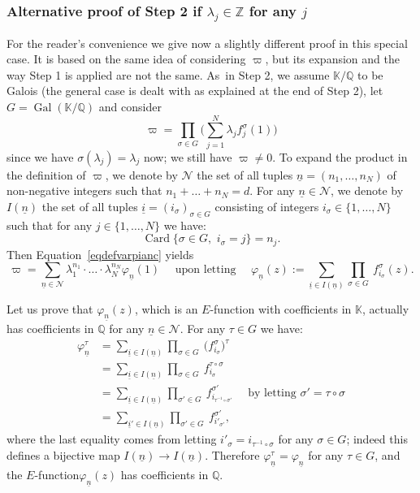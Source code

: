 \documentclass[11pt]{article}
\numberwithin{equation}{section}
\newcommand{\Efunction}{$E$\nobreakdash-func\-tion\xspace}
\theoremstyle{definition}
\newcommand{\Z}{\mathbb{Z}}
\newcommand{\Q}{\mathbb{Q}}
\newcommand{\K}{\mathbb{K}}
\DeclareMathOperator{\Gal}{Gal}
\newcommand{\calN}{\mathcal N}
\DeclareMathOperator{\Card}{Card}
\newcommand{\isoul}{{\underline{i}}}
\newcommand{\nsoul}{\underline{n}}
\begin{document}
\subsubsection*{Alternative proof of Step 2 if $\lambda_j\in\Z$ for any $j$}
For the reader's convenience we give now a slightly different proof in this special case. It is based on the same idea of considering $\varpi$, but its expansion and the way Step 1 is applied are not the same. As~in Step 2, we assume $\K/\Q$ to be Galois (the general case is dealt with as explained at the end of Step 2), let $G=\Gal(\K/\Q)$ and consider
\begin{equation} \label{eqdefvarpianc}
\varpi = \prod_{\sigma\in G} \Big( \sum_{j=1}^N \lambda_j f_j^\sigma(1)\Big)
\end{equation}
since we have $\sigma(\lambda_j)=\lambda_j$ now; we still have $\varpi\neq 0$. To expand the product in the definition of $\varpi$, we denote by $\calN$ the set of all tuples $\nsoul = (n_1,\ldots,n_N)$ of non-negative integers such that $ n_1 + \ldots + n_N = d$. For any $\nsoul\in\calN$, we denote by $I(\nsoul) $ the set of all tuples $\isoul = (i_\sigma)_{\sigma\in G}$ consisting of	 integers $i_\sigma\in\{1,\ldots,N\}$ such that for any $j\in\{1,\ldots,N\}$ we have:
\[
\Card \{ \sigma\in G, \, \, i_\sigma=j\}=n_j.
\]
Then Equation~\eqref{eqdefvarpianc} yields
\begin{equation} \label{eqvarpi2}
\varpi = \sum_{\nsoul \in \calN} \lambda_1^{n_1} \cdot \ldots \cdot \lambda_N^{n_N} \varphi_{\nsoul}(1) \quad \mbox{ upon letting }\quad
\varphi_{\nsoul}(z) := \sum_{ \isoul\in I(\nsoul)} \prod_{\sigma\in G} \ f_{i_\sigma}^\sigma(z) .
\end{equation}

Let us prove that $\varphi_{\nsoul}(z)$, which is an \Efunction with coefficients in $\K$, actually has coefficients in $\Q$ for any $\nsoul\in\calN$. For any $\tau\in G$ we have:
\begin{align*}
\varphi_{\nsoul} ^\tau
&= \sum_{ \isoul\in I(\nsoul)} \prod_{\sigma\in G} \ \Big( f_{i_\sigma}^\sigma \Big)^\tau \\
&= \sum_{ \isoul\in I(\nsoul)} \prod_{\sigma\in G} \ f_{i_\sigma}^{\tau\circ\sigma} \\
&= \sum_{ \isoul\in I(\nsoul)} \prod_{\sigma'\in G} \ f_{i_{\tau^{-1}\circ\sigma'}}^{ \sigma'} \quad \mbox{ by letting } \sigma'=\tau\circ\sigma\\
&= \sum_{ \isoul' \in I(\nsoul)} \prod_{\sigma'\in G} \ f_{i'_{ \sigma'}}^{ \sigma'},
\end{align*}
where the last equality comes from letting $ i'_\sigma = i_{\tau^{-1}\circ\sigma}$ for any $\sigma\in G$; indeed this defines a bijective map $I(\nsoul)\to I(\nsoul)$. Therefore $\varphi_{\nsoul} ^\tau = \varphi_{\nsoul}$ for any $\tau\in G$, and the \Efunction $\varphi_{\nsoul}(z)$ has coefficients in $\Q$.
\end{document}
